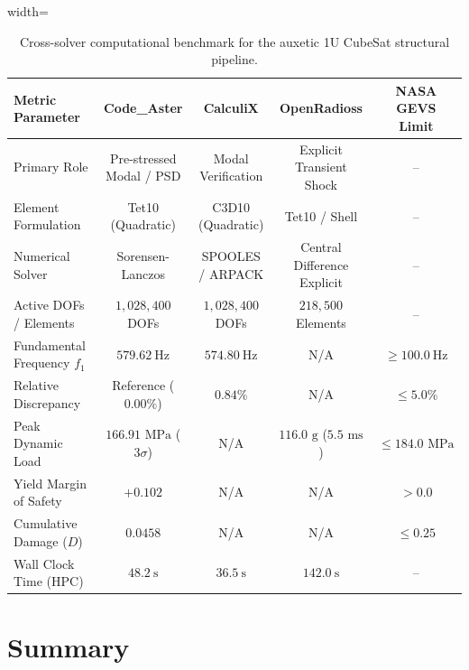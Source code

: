 \begin{table}[htbp]
\centering
\caption{Cross-solver computational benchmark for the auxetic 1U CubeSat structural pipeline.}
\label{tab:fea_solver_benchmark}
\begin{adjustbox}{width=\textwidth}
\begin{tabular}{lcccc}
\toprule
\textbf{Metric Parameter} & \textbf{Code\_Aster} & \textbf{CalculiX} & \textbf{OpenRadioss} & \textbf{NASA GEVS Limit} \\
\midrule
Primary Role & Pre-stressed Modal / PSD & Modal Verification & Explicit Transient Shock & -- \\
Element Formulation & Tet10 (Quadratic) & C3D10 (Quadratic) & Tet10 / Shell & -- \\
Numerical Solver & Sorensen-Lanczos & SPOOLES / ARPACK & Central Difference Explicit & -- \\
Active DOFs / Elements & $1{,}028{,}400$ DOFs & $1{,}028{,}400$ DOFs & $218{,}500$ Elements & -- \\
Fundamental Frequency $f_1$ & $\SI{579.62}{\hertz}$ & $\SI{574.80}{\hertz}$ & N/A & $\ge \SI{100.0}{\hertz}$ \\
Relative Discrepancy & Reference ($0.00\%$) & $\mathbf{0.84\%}$ & N/A & $\le 5.0\%$ \\
Peak Dynamic Load & $166.91\text{ MPa}$ ($3\sigma$) & N/A & $116.0\text{ g}$ ($5.5\text{ ms}$) & $\le 184.0\text{ MPa}$ \\
Yield Margin of Safety & $\mathbf{+0.102}$ & N/A & N/A & $> 0.0$ \\
Cumulative Damage ($D$) & $\mathbf{0.0458}$ & N/A & N/A & $\le 0.25$ \\
Wall Clock Time (HPC) & $\SI{48.2}{\second}$ & $\SI{36.5}{\second}$ & $\SI{142.0}{\second}$ & -- \\
\bottomrule
\end{tabular}
\end{adjustbox}
\end{table}

\section{Summary}
\label{sec:fea_summary}

